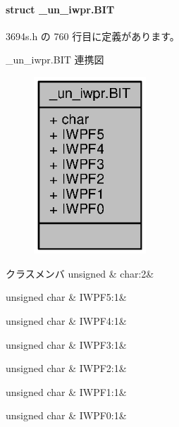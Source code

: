 \paragraph{struct \+\_\+un\+\_\+iwpr.\+B\+I\+T}


 3694s.\+h の 760 行目に定義があります。



\+\_\+un\+\_\+iwpr.\+B\+I\+T 連携図
\nopagebreak
\begin{figure}[H]
\begin{center}
\leavevmode
\includegraphics[width=119pt]{d4/d13/struct__un__iwpr_8BIT__coll__graph}
\end{center}
\end{figure}
\begin{DoxyFields}{クラスメンバ}
unsigned\label{3694s_8h_aa87deb01c5f539e6bda34829c8ef2368}
&
char\+:2&
\\
\hline

unsigned char\label{3694s_8h_a57be2639f145ad240214510e2999ec05}
&
I\+W\+P\+F5\+:1&
\\
\hline

unsigned char\label{3694s_8h_a38b8fd810ccd3263898c5f1e0eff767b}
&
I\+W\+P\+F4\+:1&
\\
\hline

unsigned char\label{3694s_8h_a693318e4d7cbf085909ebd17580d6b25}
&
I\+W\+P\+F3\+:1&
\\
\hline

unsigned char\label{3694s_8h_ae2fd91127a4fde2ee8e4e98188933c2e}
&
I\+W\+P\+F2\+:1&
\\
\hline

unsigned char\label{3694s_8h_a69f4672f40adf590ff8dd4a5f5f402c1}
&
I\+W\+P\+F1\+:1&
\\
\hline

unsigned char\label{3694s_8h_a7cae2610b6cb1b48cc69be5b744a1a13}
&
I\+W\+P\+F0\+:1&
\\
\hline

\end{DoxyFields}
\label{struct__un__mstcr1_8BIT}
